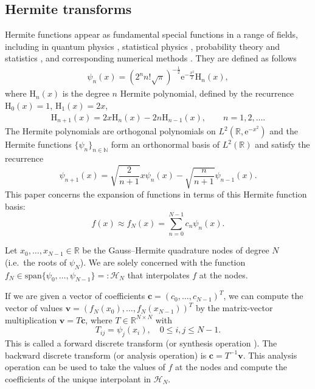 \documentclass[10pt]{article}
\numberwithin{theorem}{section}
\begin{document}
\subsection{Hermite transforms}

Hermite functions appear as fundamental special functions in a range of fields, including in quantum physics \cite{griffiths2018introduction}, statistical physics \cite{grohs2017tensor,WANG2019108815}, probability theory and statistics \cite{walter1977properties,izenman1991review}, and corresponding numerical methods \cite{Thalhammer2012,ThCaNe2009,gauckler2011convergence,amparoseguratemme2007,olver2020fast, iserles2023approximation}. They are defined as follows%
\begin{align}\label{eqn:def_hermite_fns}
    \psi_n(x) = (2^n n! \sqrt{\pi})^{-\frac12} \mathrm{e}^{-\frac{x^2}{2}} \mathrm{H}_n(x),
\end{align}
where $\mathrm{H}_n(x)$ is the degree $n$ Hermite polynomial, defined by the recurrence $\mathrm{H}_0(x) = 1$, $\mathrm{H}_1(x) = 2x$,
\begin{align*}
    \mathrm{H}_{n+1}(x) = 2x\mathrm{H}_n(x) - 2n\mathrm{H}_{n-1}(x), \qquad n = 1,2,\ldots.
\end{align*}
The Hermite polynomials are orthogonal polynomials on $L^2(\mathbb{R},\mathrm{e}^{-x^2})$ and the Hermite functions $\{\psi_n\}_{n\in\mathbb{N}}$ form an orthonormal basis of $L^2(\mathbb{R})$ and satisfy the recurrence
\begin{equation}\label{eqn:hermiterec}
    \psi_{n+1}(x) = \sqrt{\frac{2}{n+1}}x\psi_n(x) - \sqrt{\frac{n}{n+1}}\psi_{n-1}(x).
\end{equation}
This paper concerns the expansion of functions in terms of this Hermite function basis:
\begin{equation}\label{eqn:finite_expansion}
    f(x) \approx f_N(x) = \sum_{n=0}^{N{-}1} c_n \psi_n(x).
\end{equation}

Let $x_0,\dots, x_{N{-}1}\in\mathbb{R}$ be the Gauss--Hermite quadrature nodes of degree $N$ (i.e.~the roots of $\psi_N$). We are solely concerned with the function $f_N \in \mathrm{span}\{\psi_0,\ldots,\psi_{N{-}1} \} = :\mathcal{H}_N$ that interpolates $f$ at the nodes.

If we are given a vector of coefficients $\mathbf{c} = (c_0,\ldots,c_{N{-}1})^T$, we can compute the vector of values $\mathbf{v} = (f_N(x_0),\ldots,f_N(x_{N{-}1}))^T$ by the matrix-vector multiplication $\mathbf{v} = T\mathbf{c}$, where ${T}\in\mathbb{R}^{N\times N}$ with
\begin{equation}\label{eqn:T}
    {T}_{ij}=\psi_{j}(x_i), \quad 0\leq i,j\leq N{-}1.
\end{equation}
This is called a forward discrete transform (or synthesis operation \cite{olver2020fast}). The backward discrete transform (or analysis operation) is $\mathbf{c} = T^{-1}\mathbf{v}$. This analysis operation can be used to take the values of $f$ at the nodes and compute the coefficients of the unique interpolant in $\mathcal{H}_N$.
\end{document}
